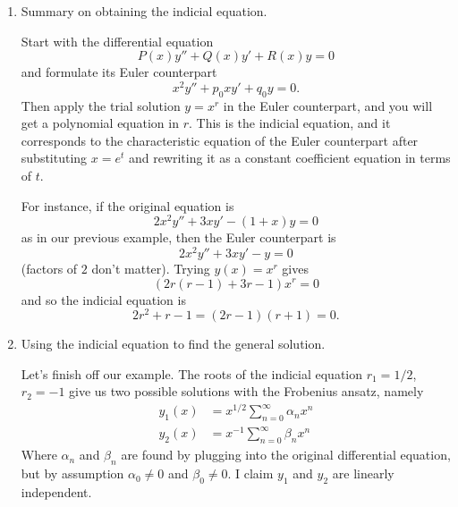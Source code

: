 \documentclass[11pt, letterpaper, oneside]{article}     %
\numberwithin{equation}{subsection}
\theoremstyle{definition}
\numberwithin{theorem}{section}
\theoremstyle{remark}
\begin{document}
\begin{enumerate}
  \underline{Remark} The indicial equation (\ref{eq:r-equation-frob}) turns out to be precisely the \emph{characteristic equation for the Euler counterpart}. This fact is a general feature of this technique of Frobenius.

\item Summary on obtaining the indicial equation.

  Start with the differential equation
  \begin{equation}
    P(x)y'' + Q(x)y' + R(x)y = 0
  \end{equation}
  and formulate its Euler counterpart
  \begin{equation}
    x^2y'' + p_0xy' + q_0y = 0.
  \end{equation}
  Then apply the trial solution $y = x^r$ in the Euler counterpart, and you will get a polynomial equation in $r$. This is the indicial equation, and it corresponds to the characteristic equation of the Euler counterpart after substituting $x = e^t$ and rewriting it as a constant coefficient equation in terms of $t$.

  For instance, if the original equation is
  \begin{equation}
    2x^2y'' +3xy' - (1+x)y = 0
  \end{equation}
  as in our previous example, then the Euler counterpart is
  \begin{equation}
    2x^2y'' + 3xy' - y = 0
  \end{equation}
  (factors of $2$ don't matter).
  Trying $y(x) = x^r$ gives
  \begin{equation}
    (2r(r-1) + 3r - 1)x^r = 0
  \end{equation}
  and so the indicial equation is
  \begin{equation}
    2r^2 + r - 1 = (2r - 1)(r+1) = 0.
  \end{equation}

\item Using the indicial equation to find the general solution.

  Let's finish off our example. The roots of the indicial equation $r_1 = 1/2$, $r_2 = -1$ give us two possible solutions with the Frobenius ansatz, namely
  \begin{align}
    y_1(x) &= x^{1/2}\sum_{n=0}^\infty \alpha_nx^n\\
    y_2(x) &= x^{-1}\sum_{n=0}^\infty \beta_nx^n
  \end{align}
  Where $\alpha_n$ and $\beta_n$ are found by plugging into the original differential equation, but by assumption $\alpha_0 \neq 0$ and $\beta_0 \neq 0$. I claim $y_1$ and $y_2$ are linearly independent.


\end{enumerate}
\end{document}
